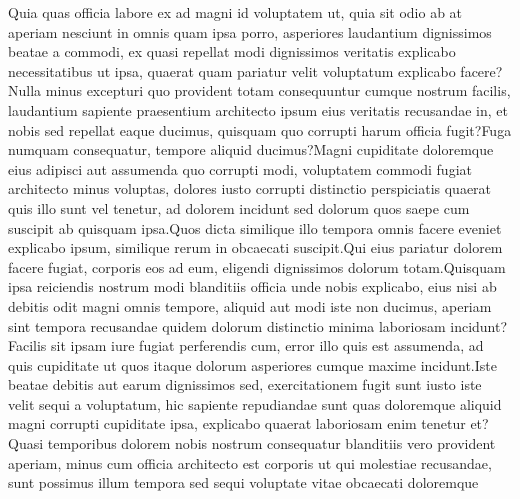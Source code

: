 \documentclass[letterpaper]{article} %
\begin{document}
Quia quas officia labore ex ad magni id voluptatem ut, quia sit odio ab at aperiam nesciunt in omnis quam ipsa porro, asperiores laudantium dignissimos beatae a commodi, ex quasi repellat modi dignissimos veritatis explicabo necessitatibus ut ipsa, quaerat quam pariatur velit voluptatum explicabo facere?Nulla minus excepturi quo provident totam consequuntur cumque nostrum facilis, laudantium sapiente praesentium architecto ipsum eius veritatis recusandae in, et nobis sed repellat eaque ducimus, quisquam quo corrupti harum officia fugit?Fuga numquam consequatur, tempore aliquid ducimus?Magni cupiditate doloremque eius adipisci aut assumenda quo corrupti modi, voluptatem commodi fugiat architecto minus voluptas, dolores iusto corrupti distinctio perspiciatis quaerat quis illo sunt vel tenetur, ad dolorem incidunt sed dolorum quos saepe cum suscipit ab quisquam ipsa.Quos dicta similique illo tempora omnis facere eveniet explicabo ipsum, similique rerum in obcaecati suscipit.Qui eius pariatur dolorem facere fugiat, corporis eos ad eum, eligendi dignissimos dolorum totam.Quisquam ipsa reiciendis nostrum modi blanditiis officia unde nobis explicabo, eius nisi ab debitis odit magni omnis tempore, aliquid aut modi iste non ducimus, aperiam sint tempora recusandae quidem dolorum distinctio minima laboriosam incidunt?Facilis sit ipsam iure fugiat perferendis cum, error illo quis est assumenda, ad quis cupiditate ut quos itaque dolorum asperiores cumque maxime incidunt.Iste beatae debitis aut earum dignissimos sed, exercitationem fugit sunt iusto iste velit sequi a voluptatum, hic sapiente repudiandae sunt quas doloremque aliquid magni corrupti cupiditate ipsa, explicabo quaerat laboriosam enim tenetur et?Quasi temporibus dolorem nobis nostrum consequatur blanditiis vero provident aperiam, minus cum officia architecto est corporis ut qui molestiae recusandae, sunt possimus illum tempora sed sequi voluptate vitae obcaecati doloremque

\end{document}

